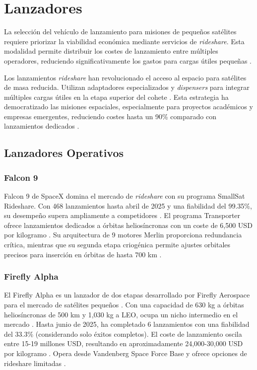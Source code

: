 \chapter{Lanzadores}
\minitoc

La selección del vehículo de lanzamiento para misiones de pequeños satélites requiere priorizar la viabilidad económica mediante servicios de \textit{rideshare}. Esta modalidad permite distribuir los costes de lanzamiento entre múltiples operadores, reduciendo significativamente los gastos para cargas útiles pequeñas \cite{spacex2022}.

Los lanzamientos \textit{rideshare} han revolucionado el acceso al espacio para satélites de masa reducida. Utilizan adaptadores especializados y \textit{dispensers} para integrar múltiples cargas útiles en la etapa superior del cohete \cite{esa2024}. Esta estrategia ha democratizado las misiones espaciales, especialmente para proyectos académicos y empresas emergentes, reduciendo costes hasta un 90\% comparado con lanzamientos dedicados \cite{lionnet2025}.

\section{Lanzadores Operativos}

\subsection{Falcon 9}

Falcon 9 de SpaceX domina el mercado de \textit{rideshare} con su programa SmallSat Rideshare. Con 468 lanzamientos hasta abril de 2025 y una fiabilidad del 99.35\%, su desempeño supera ampliamente a competidores \cite{satellitetoday2024}. El programa Transporter ofrece lanzamientos dedicados a órbitas heliosíncronas con un coste de 6,500 USD por kilogramo \cite{spacex2022, payloadspace2023}. Su arquitectura de 9 motores Merlin proporciona redundancia crítica, mientras que su segunda etapa criogénica permite ajustes orbitales precisos para inserción en órbitas de hasta 700 km \cite{wikipedia2024}.

\subsection{Firefly Alpha}

El Firefly Alpha es un lanzador de dos etapas desarrollado por Firefly Aerospace para el mercado de satélites pequeños . Con una capacidad de 630 kg a órbitas heliosíncronas de 500 km y 1,030 kg a LEO, ocupa un nicho intermedio en el mercado . Hasta junio de 2025, ha completado 6 lanzamientos con una fiabilidad del 33.3\% (considerando solo éxitos completos). El coste de lanzamiento oscila entre 15-19 millones USD, resultando en aproximadamente 24,000-30,000 USD por kilogramo . Opera desde Vandenberg Space Force Base y ofrece opciones de rideshare limitadas \cite{fireflyspace2024}.

